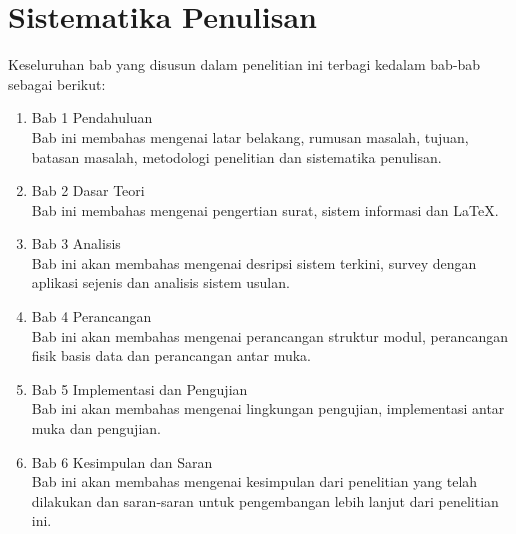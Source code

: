 \section{Sistematika Penulisan}
\label{sec:sistematika_penulisan}
Keseluruhan bab yang disusun dalam penelitian ini terbagi kedalam bab-bab sebagai berikut:
\begin{enumerate}
	\item Bab 1 Pendahuluan \\
	Bab ini membahas mengenai latar belakang, rumusan masalah, tujuan, batasan masalah, metodologi penelitian dan sistematika penulisan.
	\item Bab 2 Dasar Teori \\
	Bab ini membahas mengenai pengertian surat, sistem informasi dan \LaTeX.
	\item Bab 3 Analisis \\
	Bab ini akan membahas mengenai desripsi sistem terkini, survey dengan aplikasi sejenis dan analisis sistem usulan.
	\item Bab 4 Perancangan \\
	Bab ini akan membahas mengenai perancangan struktur modul, perancangan fisik basis data dan perancangan antar muka.
	\item Bab 5 Implementasi dan Pengujian \\
	Bab ini akan membahas mengenai lingkungan pengujian, implementasi antar muka dan pengujian.
	\item Bab 6 Kesimpulan dan Saran \\ 
	Bab ini akan membahas mengenai kesimpulan dari penelitian yang telah dilakukan dan saran-saran untuk pengembangan lebih lanjut dari penelitian ini.
\end{enumerate}

